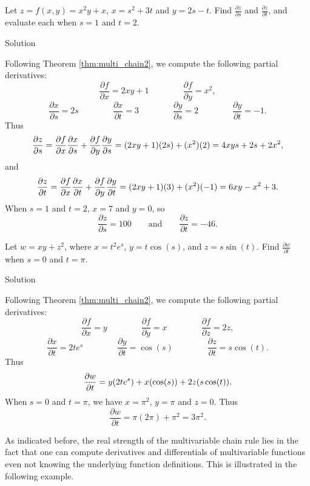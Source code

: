 \begin{example}\label{ex_mchain3}
Let $z=f(x,y)=x^2y+x$, $x=s^2+3t$ and $y=2s-t$. Find $\frac{\partial z}{\partial s}$ and $\frac{\partial z}{\partial t}$, and evaluate each when $s=1$ and $t=2$.

\ifcalculus\pagebreak\fi
{}Solution 

Following Theorem \ref{thm:multi_chain2}, we compute the following partial derivatives:
$$\frac{\partial f}{\partial x} = 2xy+1\qquad\qquad \frac{\partial f}{\partial y} = x^2,$$
$$\frac{\partial x}{\partial s} = 2s \qquad\qquad \frac{\partial x}{\partial t} = 3\qquad\qquad \frac{\partial y}{\partial s} = 2 \qquad\qquad \frac{\partial y}{\partial t} = -1.$$
Thus 
$$\displaystyle \frac{\partial z}{\partial s}=\frac{\partial f}{\partial x}\frac{\partial x}{\partial s} +\frac{\partial f}{\partial y}\frac{\partial y}{\partial s}= (2xy+1)(2s) + (x^2)(2) = 4xys+2s + 2x^2,$$
and
$$\displaystyle \frac{\partial z}{\partial t}=\frac{\partial f}{\partial x}\frac{\partial x}{\partial t} +\frac{\partial f}{\partial y}\frac{\partial y}{\partial t} = (2xy+1)(3) + (x^2)(-1) = 6xy-x^2+3.$$
When $s=1$ and $t=2$, $x= 7$ and $y= 0$, so 
$$\frac{\partial z}{\partial s} = 100\qquad \text{and}\qquad \frac{\partial z}{\partial t} = -46.$$
\end{example}

\begin{example}\label{ex_mchain4}
Let $w = xy+z^2$, where $x= t^2e^s$, $y= t\cos(s)$, and $z=s\sin(t)$. Find $\frac{\partial w}{\partial t}$ when $s=0$ and $t=\pi$.

Solution 

Following Theorem \ref{thm:multi_chain2}, we compute the following partial derivatives:
$$\frac{\partial f}{\partial x} = y\qquad\qquad \frac{\partial f}{\partial y} = x\qquad\qquad \frac{\partial f}{\partial z} = 2z,$$
$$\frac{\partial x}{\partial t} = 2te^s\qquad\qquad \frac{\partial y}{\partial t} = \cos (s)\qquad\qquad \frac{\partial z}{\partial t} = s\cos (t).$$
Thus $$\displaystyle \frac{\partial w}{\partial t} = y(2te^s) + x(\cos(s)) + 2z(s\cos(t)).$$ 
When $s=0$ and $t=\pi$, we have $x=\pi^2$, $y=\pi$ and $z=0$. Thus
$$\frac{\partial w}{\partial t} = \pi(2\pi) + \pi^2 = 3\pi^2.$$
\end{example}


\ifanalysis

As indicated before, the real strength of the multivariable chain rule lies in the fact that one can compute derivatives and differentials of multivariable functions even not knowing the underlying function definitions. This is illustrated in the following example.


